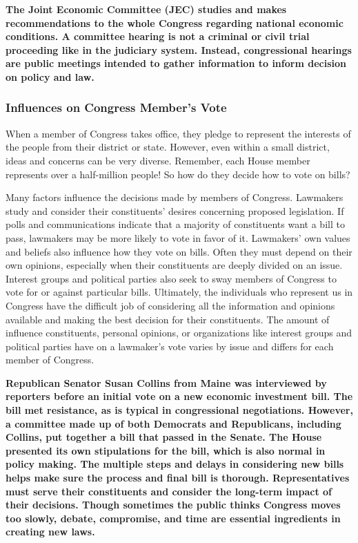 \bf{The Joint Economic Committee (JEC)} studies and makes recommendations to the whole Congress regarding national economic conditions. A committee hearing is not a criminal or civil trial proceeding like in the judiciary system. Instead, congressional hearings are public meetings intended to gather information to inform decision on policy and law.

\subsubsection*{Influences on Congress Member's Vote}

When a member of Congress takes office, they pledge to represent the interests of the people from their district or state. However, even within a small district, ideas and concerns can be very diverse. Remember, each House member represents over a half-million people! So how do they decide how to vote on bills?

Many factors influence the decisions made by members of Congress. Lawmakers study and consider their constituents' desires concerning proposed legislation. If polls and communications indicate that a majority of constituents want a bill to pass, lawmakers may be more likely to vote in favor of it. Lawmakers' own values and beliefs also influence how they vote on bills. Often they must depend on their own opinions, especially when their constituents are deeply divided on an issue. Interest groups and political parties also seek to sway members of Congress to vote for or against particular bills. Ultimately, the individuals who represent us in Congress have the difficult job of considering all the information and opinions available and making the best decision for their constituents. The amount of influence constituents, personal opinions, or organizations like interest groups and political parties have on a lawmaker's vote varies by issue and differs for each member of Congress.

\bf{Republican Senator Susan Collins} from Maine was interviewed by reporters before an initial vote on a new economic investment bill. The bill met resistance, as is typical in congressional negotiations. However, a committee made up of both Democrats and Republicans, including Collins, put together a bill that passed in the Senate. The House presented its own stipulations for the bill, which is also normal in policy making. The multiple steps and delays in considering new bills helps make sure the process and final bill is thorough. Representatives must serve their constituents and consider the long-term impact of their decisions. Though sometimes the public thinks Congress moves too slowly, debate, compromise, and time are essential ingredients in creating new laws.

\newpage
